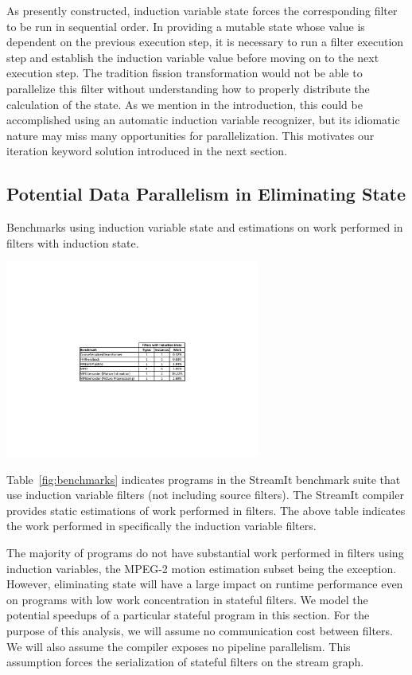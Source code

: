 As presently constructed, induction variable state for\-ces the
corresponding filter to be run in sequential order.  In providing a
mutable state whose value is dependent on the previous execution step,
it is necessary to run a filter execution step and establish the
induction variable value before moving on to the next execution step.
The tradition fission transformation would not be able to parallelize
this filter without understanding how to properly distribute the
calculation of the state.  As we mention in the introduction, this
could be accomplished using an automatic induction variable
recognizer, but its idiomatic nature may miss many opportunities for
parallelization.  This motivates our iteration keyword solution
introduced in the next section.

\subsection{Potential Data Parallelism in Eliminating State}

\begin{table}[t]
\caption{Benchmarks using induction variable state and estimations on work performed in filters with induction state.\protect\label{fig:benchmarks}}
\includegraphics[width=3.3in]{figures/induction-benchmarks.pdf}
\end{table}

Table~\ref{fig:benchmarks} indicates programs in the StreamIt benchmark suite that use induction variable filters (not including source filters).  The StreamIt compiler provides static estimations of work performed in filters.  The above table indicates the work performed in specifically the induction variable filters.

The majority of programs do not have substantial work performed in filters using induction variables, the MPEG-2 motion estimation subset being the exception.  However, eliminating state will have a large impact on runtime performance even on programs with low work concentration in stateful filters.  We model the potential speedups of a particular stateful program in this section.  For the purpose of this analysis, we will assume no communication cost between filters.  We will also assume the compiler exposes no pipeline parallelism.  This assumption forces the serialization of stateful filters on the stream graph.

